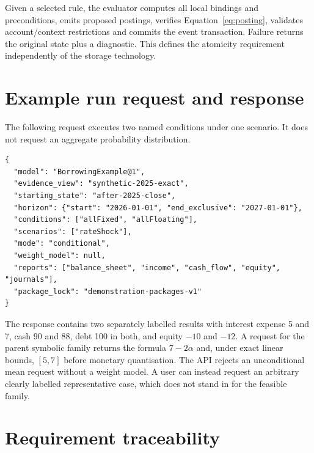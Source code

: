 Given a selected rule, the evaluator computes all local bindings and
preconditions, emits proposed postings, verifies
Equation~\eqref{eq:posting}, validates account/context restrictions and commits
the event transaction. Failure returns the original state plus a diagnostic.
This defines the atomicity requirement independently of the storage technology.

\begin{minipage}{\linewidth}
\section{Example run request and response}

The following request executes two named conditions under one scenario. It
does not request an aggregate probability distribution.

\begin{lstlisting}
{
  "model": "BorrowingExample@1",
  "evidence_view": "synthetic-2025-exact",
  "starting_state": "after-2025-close",
  "horizon": {"start": "2026-01-01", "end_exclusive": "2027-01-01"},
  "conditions": ["allFixed", "allFloating"],
  "scenarios": ["rateShock"],
  "mode": "conditional",
  "weight_model": null,
  "reports": ["balance_sheet", "income", "cash_flow", "equity", "journals"],
  "package_lock": "demonstration-packages-v1"
}
\end{lstlisting}
\end{minipage}

The response contains two separately labelled results with interest expense
5 and 7, cash 90 and 88, debt 100 in both, and equity $-10$ and $-12$.
A request for the parent symbolic family returns the formula
$7-2\alpha$ and, under exact linear bounds, $[5,7]$ before monetary
quantisation. The API rejects an unconditional mean request without a weight
model. A user can instead request an arbitrary clearly labelled representative
case, which does not stand in for the feasible family.

\section{Requirement traceability}

